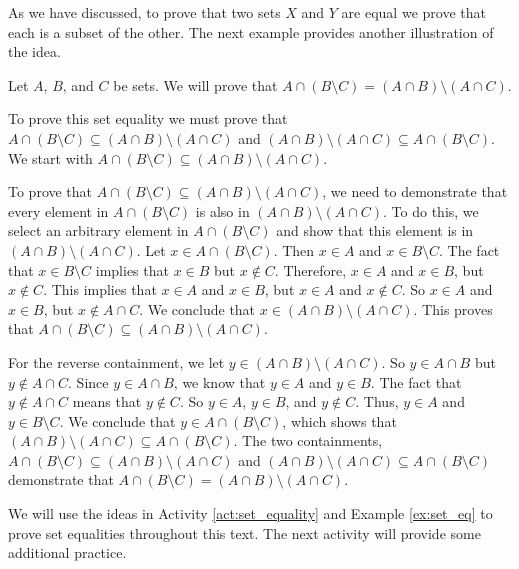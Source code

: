As we have discussed, to prove that two sets $X$ and $Y$ are equal we prove that each is a subset of the other. The next example provides another illustration of the  idea.

\begin{example} \label{ex:set_eq} Let $A$, $B$, and $C$ be sets. We will prove that $A \cap (B \setminus C) = (A \cap B) \setminus (A \cap C)$. 

To prove this set equality we must prove that $A \cap (B \setminus C) \subseteq (A \cap B) \setminus (A \cap C)$ and $(A \cap B) \setminus (A \cap C) \subseteq A \cap (B \setminus C)$. We start with $A \cap (B \setminus C) \subseteq (A \cap B) \setminus (A \cap C)$.

To prove that $A \cap (B \setminus C) \subseteq (A \cap B) \setminus (A \cap C)$, we need to demonstrate that every element in $A \cap (B \setminus C)$ is also in $(A \cap B) \setminus (A \cap C)$. To do this, we select an arbitrary element in $A \cap (B \setminus C)$ and show that this element is in $(A \cap B) \setminus (A \cap C)$. Let $x \in A \cap (B \setminus C)$. Then $x \in A$ and $x \in B \setminus C$. The fact that $x \in B \setminus C$ implies that $x \in B$ but $x \notin C$. Therefore, $x \in A$ and $x \in B$, but $x \notin C$. This implies that $x \in A$ and $x \in B$, but $x \in A$ and $x \notin C$. So $x \in A$ and $x \in B$, but $x \notin A \cap C$. We conclude that $x \in (A \cap B) \setminus (A \cap C)$. This proves that $A \cap (B \setminus C) \subseteq (A \cap B) \setminus (A \cap C)$.

For the reverse containment, we let $y \in (A \cap B) \setminus (A \cap C)$. So $y \in A \cap B$ but $y \notin A \cap C$. Since $y \in A \cap B$, we know that $y \in A$ and $y \in B$. The fact that $y \notin A \cap C$ means that $y \notin C$. So $y \in A$, $y \in B$, and $y \notin C$.  Thus, $y \in A$ and $y \in B \setminus C$. We conclude that $y \in A \cap (B \setminus C)$, which shows that $(A \cap B) \setminus (A \cap C) \subseteq A \cap (B \setminus C)$. The two containments, $A \cap (B \setminus C) \subseteq (A \cap B) \setminus (A \cap C)$ and $(A \cap B) \setminus (A \cap C) \subseteq A \cap (B \setminus C)$ demonstrate that $A \cap (B \setminus C) = (A \cap B) \setminus (A \cap C)$.

\end{example}

We will use the ideas in Activity \ref{act:set_equality} and Example \ref{ex:set_eq} to prove set equalities throughout this text. The next activity will provide some additional practice. 
 
